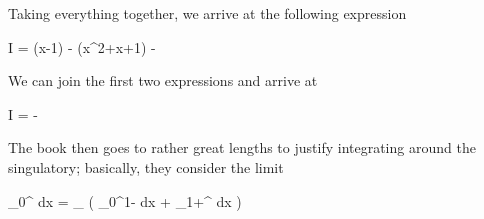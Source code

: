 Taking everything together, we arrive at the following expression

\bee
I =  \ln (x-1) -  \ln (x^2+x+1) -  \arctan {}
\eee

We can join the first two expressions and arrive at

\bee
I =  \ln {} -  \arctan {}
\eee

The book then goes to rather great lengths to justify integrating around the singulatory; basically, they consider the limit

\bee
\int_0^\infty {} dx = \lim_{\epsilon {}} \left( \int_0^{1-\epsilon}  dx + \int_{1+\epsilon}^\infty {} dx \right)
\eee

